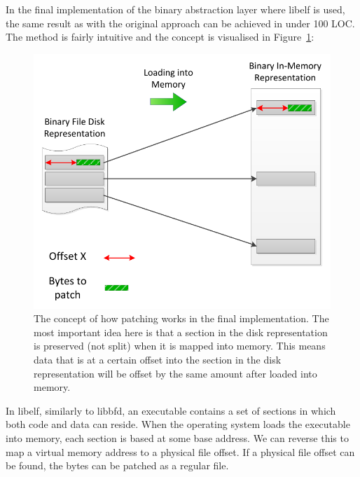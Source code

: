 In the final implementation of the binary abstraction layer where libelf is used, the same result as with the original approach can be achieved in under 100 LOC. The method is fairly intuitive and the concept is visualised in Figure~\ref{fig:Loading_Binary}:
 
\begin{figure}[H]
 \centering
 \includegraphics{Loading_Binary.pdf}
 \caption{The concept of how patching works in the final implementation. The most important idea here is that a section in the disk representation is preserved (not split) when it is mapped into memory. This means data that is at a certain offset into the section in the disk representation will be offset by the same amount after loaded into memory.}
\label{fig:Loading_Binary}
\end{figure}
 
In libelf, similarly to libbfd, an executable contains a set of sections in which both code and data can reside. When the operating system loads the executable into memory, each section is based at some base address. We can reverse this to map a virtual memory address to a physical file offset. If a physical file offset can be found, the bytes can be patched as a regular file.

